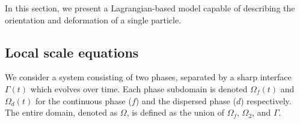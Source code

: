 
In this section, we present a Lagrangian-based model capable of describing the orientation and deformation of a single particle. 
\label{sec:local_eq_ellipse}

\subsection{Local scale equations}

We consider a system consisting of two phases, separated by a sharp interface $\Gamma(t)$ which evolves over time. 
Each phase subdomain is denoted $\Omega_f(t)$ and $\Omega_d(t)$ for the continuous phase ($f$) and the dispersed phase ($d$) respectively. 
The entire domain, denoted as $\Omega$, is defined as the union of $\Omega_f$, $\Omega_2$, and $\Gamma$.

